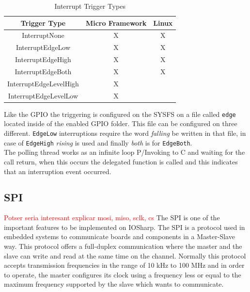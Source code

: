 \begin{table}[htb]
\begin{center}
\begin{tabular}{|c|c|c|}
\hline
{\bf Trigger Type} & {\bf Micro Framework} & {\bf Linux}  \\ \hline \hline
InterruptNone        & X    & X       \\ \hline
InterruptEdgeLow        & X    & X       \\ \hline
InterruptEdgeHigh        & X    & X       \\ \hline
InterruptEdgeBoth        & X    & X       \\ \hline
InterruptEdgeLevelHigh        & X    &        \\ \hline
InterruptEdgeLevelLow        & X    &        \\ \hline
\end{tabular}
\caption{Interrupt Trigger Types}
\label{T:Interrupt-Trigger-Types}
\end{center}
\end{table}

Like the GPIO the triggering is configured on the SYSFS on a file called \verb!edge! located inside of the enabled GPIO folder. This file can be configured on three different. \verb!EdgeLow! interruptions require the word \textit{falling} be written in that file, in case of \verb!EdgeHigh! \textit{rising} is used and finally \textit{both} is for \verb!EdgeBoth!.
\\
The polling thread works as an infinite loop P/Invoking to C and waiting for the call return, when this occurs the delegated function is called and this indicates that an interruption event occurred.

\subsection{SPI}\label{SS:IOSharp-SPI}
\textcolor{red}{Potser seria interesant explicar mosi, miso, sclk, cs}
The \gls{SPI} is one of the important features to be implemented on IOSharp. The SPI is a protocol used in embedded systems to communicate boards and components in a Master-Slave way. This protocol offers a full-duplex communication where the master and the slave can write and read at the same time on the channel. Normally this protocol accepts transmission frequencies in the range of 10 kHz to 100 MHz and in order to operate, the master configures its clock using a frequency less or equal to the maximum frequency supported by the slave which wants to communicate.

